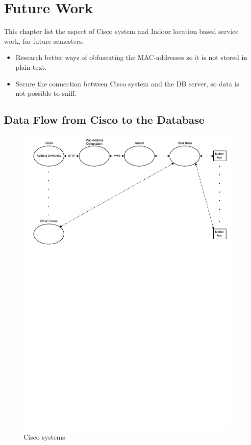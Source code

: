 \chapter{Future Work}
\label{Cha:Future_Work}
This chapter list the aspect of Cisco system and Indoor location based service work, for future semesters.

\begin{itemize}
	\item Research better ways of obfuscating the MAC-addresses so it is not stored in plain text.
	\item Secure the connection between Cisco system and the DB server, so data is not possible to sniff.
\end{itemize}


\section{Data Flow from Cisco to the Database}\label{sec:data_flow}
\begin{figure}[ht]
	\begin{center}
		\includegraphics[scale=0.7]{graphics/ciscoSmall.pdf}
		\caption{Cisco systems}
		\label{fig:cisco_systems}
	\end{center} 
\end{figure}
